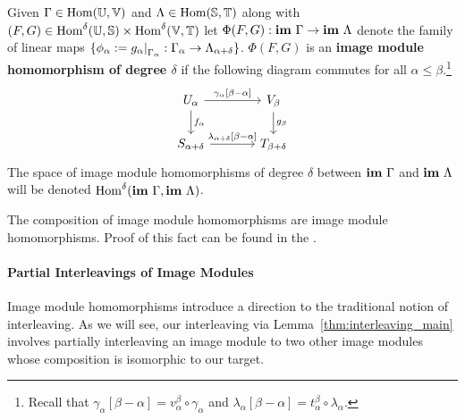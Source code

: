 \begin{definition}
  Given $\Gamma\in\mathrm{Hom}(\mathbb{U},\mathbb{V})$ and $\Lambda\in\mathrm{Hom}(\mathbb{S},\mathbb{T})$ along with $(F,G)\in\mathrm{Hom}^\delta(\mathbb{U},\mathbb{S})\times\mathrm{Hom}^\delta(\mathbb{V},\mathbb{T})$ let $\Phi(F, G) : \mathbf{im}~\Gamma\to\mathbf{im}~\Lambda$ denote the family of linear maps $\{\phi_\alpha := g_\alpha\mathord{\mid}_{\Gamma_\alpha} : \Gamma_\alpha\to\Lambda_{\alpha+\delta}\}$.
  $\Phi(F, G)$ is an \textbf{image module homomorphism of degree $\delta$} if the following diagram commutes for all $\alpha\leq\beta$.\footnote{Recall that $\gamma_\alpha[\beta-\alpha] = v_\alpha^\beta\circ\gamma_\alpha$ and $\lambda_\alpha[\beta-\alpha] = t_\alpha^\beta\circ\lambda_\alpha$.}
  \begin{equation}\label{dgm:image_homomorphism}
    \begin{tikzcd}[column sep=large]
        U_\alpha\arrow{r}{\gamma_\alpha[\beta-\alpha]}\arrow{d}{f_\alpha} &
      V_\beta\arrow{d}{g_\beta}\\
      S_{\alpha+\delta}\arrow{r}{\lambda_{\alpha+\delta}[\beta-\alpha]} &
      T_{\beta +\delta}
  \end{tikzcd}\end{equation}
  The space of image module homomorphisms of degree $\delta$ between $\mathbf{im}~\Gamma$ and $\mathbf{im}~\Lambda$ will be denoted $\mathrm{Hom}^\delta(\mathbf{im}~\Gamma,\mathbf{im}~\Lambda)$.
\end{definition}
%
%
%
The composition of image module homomorphisms are image module homomorphisms.
Proof of this fact can be found in the \fullversion.

\paragraph*{Partial Interleavings of Image Modules}

Image module homomorphisms introduce a direction to the traditional notion of interleaving.
As we will see, our interleaving via Lemma~\ref{thm:interleaving_main} involves partially interleaving an image module to two other image modules whose composition is isomorphic to our target.


